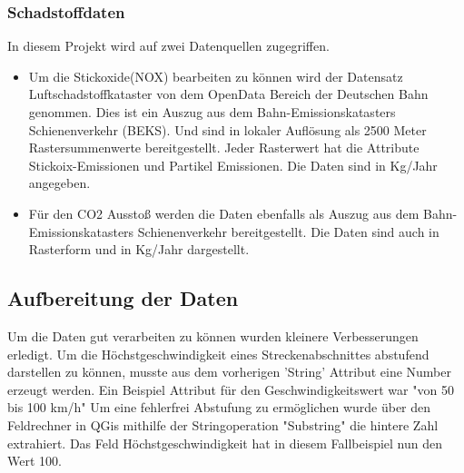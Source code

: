 \subsubsection{Schadstoffdaten}
In diesem Projekt wird auf zwei Datenquellen zugegriffen. 
\begin{itemize}
	\item Um die Stickoxide(NOX) bearbeiten zu können wird der Datensatz Luftschadstoffkataster von dem OpenData Bereich der Deutschen Bahn genommen.
Dies ist ein Auszug aus dem Bahn-Emissionskatasters Schienenverkehr (BEKS). \cite{Luftschadstoffkataster}Und sind in lokaler Auflösung als 2500 Meter Rastersummenwerte bereitgestellt.
Jeder Rasterwert hat die Attribute Stickoix-Emissionen und Partikel Emissionen. Die Daten sind in Kg/Jahr angegeben. 
\item Für den CO2 Ausstoß werden die Daten ebenfalls als Auszug aus dem Bahn-Emissionskatasters Schienenverkehr bereitgestellt. Die Daten sind auch in Rasterform und in Kg/Jahr dargestellt.
\end{itemize}
\subsection{Aufbereitung der Daten}
Um die Daten gut verarbeiten zu können wurden kleinere Verbesserungen erledigt. Um die Höchstgeschwindigkeit eines Streckenabschnittes abstufend darstellen zu können, musste aus dem vorherigen 'String' Attribut eine Number erzeugt werden.
Ein Beispiel Attribut für den Geschwindigkeitswert war "von 50 bis 100 km/h"
Um eine fehlerfrei Abstufung zu ermöglichen wurde über den Feldrechner in QGis mithilfe der Stringoperation "Substring" die hintere Zahl extrahiert.
Das Feld Höchstgeschwindigkeit hat in diesem Fallbeispiel nun den Wert 100.
